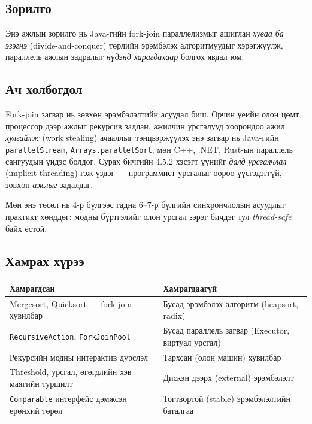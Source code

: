 \documentclass[11pt,a4paper]{article}
\begin{document}
\subsection{Зорилго}
Энэ ажлын зорилго нь Java-гийн fork-join параллелизмыг ашиглан \emph{хуваа ба
эзэгнэ} (divide-and-conquer) төрлийн эрэмбэлэх алгоритмуудыг хэрэгжүүлж,
параллель ажлын задралыг \emph{нүдэнд харагдахаар} болгох явдал юм.

\subsection{Ач холбогдол}
Fork-join загвар нь зөвхөн эрэмбэлэлтийн асуудал биш. Орчин үеийн олон цөмт
процессор дээр ажлыг рекурсив задлан, ажилчин урсгалууд хоорондоо ажил
\emph{хулгайлж} (work stealing) ачааллыг тэнцвэржүүлэх энэ загвар нь
Java-гийн \texttt{parallelStream}, \texttt{Arrays.parallelSort}, мөн C++, .NET,
Rust-ын параллель сангуудын үндэс болдог. Сурах бичгийн 4.5.2 хэсэгт үүнийг
\emph{далд урсгалчлал} (implicit threading) гэж үздэг --- программист урсгалыг
өөрөө үүсгэдэггүй, зөвхөн \emph{ажлыг} задалдаг.

Мөн энэ төсөл нь 4-р бүлгээс гадна 6--7-р бүлгийн синхрончлолын асуудлыг
практикт хөнддөг: модны бүртгэлийг олон урсгал зэрэг бичдэг тул
\emph{thread-safe} байх ёстой.

\subsection{Хамрах хүрээ}
\begin{center}
\small
\begin{tabular}{L{7.2cm}L{7.2cm}}
\toprule
\textbf{Хамрагдсан} & \textbf{Хамрагдаагүй} \\
\midrule
Mergesort, Quicksort --- fork-join хувилбар & Бусад эрэмбэлэх алгоритм
(heapsort, radix) \\
\texttt{RecursiveAction}, \texttt{ForkJoinPool} & Бусад параллель загвар
(Executor, виртуал урсгал) \\
Рекурсийн модны интерактив дүрслэл & Тархсан (олон машин) хувилбар \\
Threshold, урсгал, өгөгдлийн хэв маягийн туршилт & Дискэн дээрх (external) эрэмбэлэлт \\
\texttt{Comparable} интерфейс дэмжсэн ерөнхий төрөл & Тогтвортой (stable) эрэмбэлэлтийн баталгаа \\
\bottomrule
\end{tabular}
\end{center}
\end{document}
